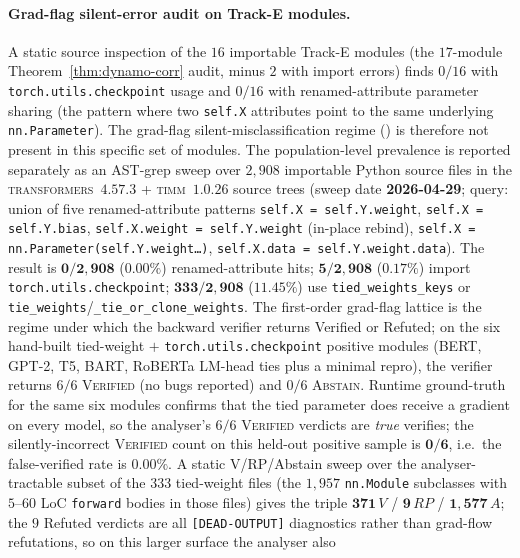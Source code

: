 \paragraph{Grad-flag silent-error audit on Track-E modules.}
A static source inspection of the $16$ importable Track-E modules
(the $17$-module Theorem~\ref{thm:dynamo-corr} audit, minus
$2$ with import errors) finds $0/16$ with \texttt{torch.utils.checkpoint}
usage and $0/16$ with renamed-attribute parameter sharing
(the pattern where two \texttt{self.X} attributes
point to the same underlying \texttt{nn.Parameter}).
The grad-flag silent-misclassification regime ()
is therefore not present in this specific set of modules.
The population-level prevalence is reported separately as an
AST-grep sweep over $2{,}908$ importable Python source files in the
\textsc{transformers}~$4.57.3$ + \textsc{timm}~$1.0.26$ source trees
(sweep date \textbf{2026-04-29}; query: union of five renamed-attribute
patterns \texttt{self.X = self.Y.weight}, \texttt{self.X = self.Y.bias},
\texttt{self.X.weight = self.Y.weight} (in-place rebind),
\texttt{self.X = nn.Parameter(self.Y.weight\ldots)},
\texttt{self.X.data = self.Y.weight.data}). The result is
\textbf{$\mathbf{0/2{,}908}$} ($0.00\%$) renamed-attribute hits;
\textbf{$\mathbf{5/2{,}908}$} ($0.17\%$) import
\texttt{torch.utils.checkpoint}; \textbf{$\mathbf{333/2{,}908}$}
($11.45\%$) use \texttt{tied\_weights\_keys} or
\texttt{tie\_weights}/\texttt{\_tie\_or\_clone\_weights}.
The first-order grad-flag lattice is the regime under which the
backward verifier returns Verified or Refuted; on the six
hand-built tied-weight $+$ \texttt{torch.utils.checkpoint}
positive modules (BERT, GPT-2, T5, BART, RoBERTa LM-head ties
plus a minimal repro), the verifier returns
\textbf{$6/6$} \textsc{Verified} (no bugs reported) and
$0/6$ \textsc{Abstain}. Runtime ground-truth for the same
six modules confirms that the tied parameter does receive a
gradient on every model, so the analyser's $6/6$ \textsc{Verified}
verdicts are \emph{true} verifies; the silently-incorrect
\textsc{Verified} count on this held-out positive sample is
$\mathbf{0/6}$, i.e.\ the false-verified rate is $0.00\%$.
A static V/RP/Abstain sweep over the analyser-tractable subset of
the $333$ tied-weight files (the $1{,}957$ \texttt{nn.Module}
subclasses with $5$--$60$ LoC \texttt{forward} bodies in those
files) gives the triple $\mathbf{371}\,V$ / $\mathbf{9}\,RP$ /
$\mathbf{1{,}577}\,A$; the $9$ Refuted verdicts are all
\texttt{[DEAD-OUTPUT]} diagnostics rather than grad-flow
refutations, so on this larger surface the analyser also
